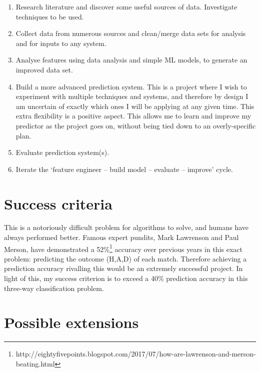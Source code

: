 \documentclass[12pt,a4paper,twoside]{article}
\begin{document}
\begin{enumerate}

\item Research literature and discover some useful sources of data. Investigate techniques to be used.

\item Collect data from numerous sources and clean/merge data sets for analysis and for inputs to any system.

\item Analyse features using data analysis and simple ML models, to generate an improved data set.

\item Build a more advanced prediction system. This is a project where I wish to experiment with multiple techniques and systems, and therefore by design I am uncertain of exactly which ones I will be applying at any given time. This extra flexibility is a positive aspect. This allows me to learn and improve my predictor as the project goes on, without being tied down to an overly-specific plan.

\item Evaluate prediction system(s).

\item Iterate the `feature engineer -- build model -- evaluate -- improve' cycle.

\end{enumerate}

\section*{Success criteria}

This is a notoriously difficult problem for algorithms to solve, and humans have always performed better. Famous expert pundits, Mark Lawrenson and Paul Merson, have demonstrated a 52\%\footnote{http://eightyfivepoints.blogspot.com/2017/07/how-are-lawrenson-and-merson-beating.html} accuracy over previous years in this exact problem: predicting the outcome (H,A,D) of each match. Therefore achieving a prediction accuracy rivalling this would be an extremely successful project. In light of this, my success criterion is to exceed a 40\% prediction accuracy in this three-way classification problem.

\section*{Possible extensions}
\end{document}
